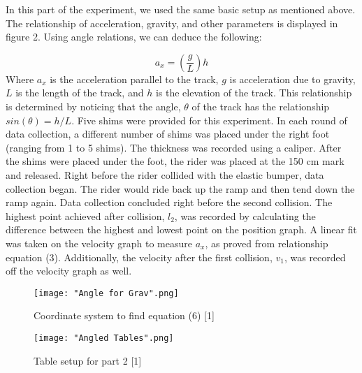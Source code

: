 \documentclass[journal,transmag]{IEEEtran}
\begin{document}
\indent In this part of the experiment, we used the same basic setup as mentioned above. The relationship of acceleration, gravity, and other parameters is displayed in figure 2. Using angle relations, we can deduce the following:

\begin{equation*}
    a_x = (\frac{g}{L})h    
\end{equation*}
\indent Where $a_x$ is the acceleration parallel to the track, $g$ is acceleration due to gravity, $L$ is the length of the track, and $h$ is the elevation of the track. This relationship is determined by noticing that the angle, $\theta$ of the track has the relationship $sin(\theta) = h/L$.
\indent Five shims were provided for this experiment. In each round of data collection, a different number of shims was placed under the right foot (ranging from 1 to 5 shims). The thickness was recorded using a caliper. After the shims were placed under the foot, the rider was placed at the 150 cm mark and released. Right before the rider collided with the elastic bumper, data collection began. The rider would ride back up the ramp and then tend down the ramp again. Data collection concluded right before the second collision. The highest point achieved after collision, $l_2$, was recorded by calculating the difference between the highest and lowest point on the position graph. A linear fit was taken on the velocity graph to measure $a_x$, as proved from relationship equation (3). Additionally, the velocity after the first collision, $v_1$, was recorded off the velocity graph as well.

\begin{figure}[h]
\caption{Coordinate system to find equation (6) [1]}
\centering
\texttt{[image: "Angle for Grav".png]}
\end{figure}
\begin{figure}[h]
\caption{Table setup for part 2 [1]}
\centering
\texttt{[image: "Angled Tables".png]}
\end{figure}
\end{document}
